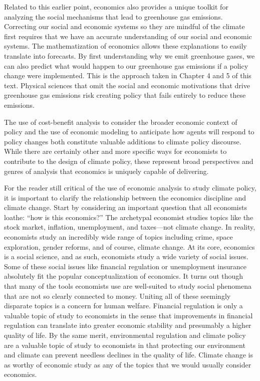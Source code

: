 Related to this earlier point, economics also provides a unique toolkit for analyzing the social mechanisms that lead to greenhouse gas emissions. Correcting our social and economic systems so they are mindful of the climate first requires that we have an accurate understanding of our social and economic systems. The mathematization of economics allows these explanations to easily translate into forecasts. By first understanding why we emit greenhouse gases, we can also predict what would happen to our greenhouse gas emissions if a policy change were implemented. This is the approach taken in Chapter 4 and 5 of this text. Physical sciences that omit the social and economic motivations that drive greenhouse gas emissions risk creating policy that fails entirely to reduce these emissions. 

The use of cost-benefit analysis to consider the broader economic context of policy and the use of economic modeling to anticipate how agents will respond to policy changes both constitute valuable additions to climate policy discourse. While there are certainly other and more specific ways for economists to contribute to the design of climate policy, these represent broad perspectives and genres of analysis that economics is uniquely capable of delivering. 

For the reader still critical of the use of economic analysis to study climate policy, it is important to clarify the relationship between the economics discipline and climate change. Start by considering an important question that all economists loathe: ``how is this economics?'' The archetypal economist studies topics like the stock market, inflation, unemployment, and taxes---not climate change. In reality, economists study an incredibly wide range of topics including crime, space exploration, gender reforms, and of course, climate change. At its core, economics is a social science, and as such, economists study a wide variety of social issues. Some of these social issues like financial regulation or unemployment insurance absolutely fit the popular conceptualization of economics. It turns out though that many of the tools economists use are well-suited to study social phenomena that are not so clearly connected to money. Uniting all of these seemingly disparate topics is a concern for human welfare. Financial regulation is only a valuable topic of study to economists in the sense that improvements in financial regulation can translate into greater economic stability and presumably a higher quality of life. By the same merit, environmental regulation and climate policy are a valuable topic of study to economists in that protecting our environment and climate can prevent needless declines in the quality of life. Climate change is as worthy of economic study as any of the topics that we would usually consider economics.

